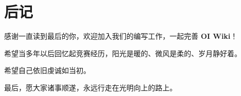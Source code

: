 \thispagestyle{empty}
\section*{\centering 后记}

\begin{center}
\par
感谢一直读到最后的你，欢迎加入我们的编写工作，一起完善 \textbf{OI Wiki}！

\vskip 0.4in
\par
希望当多年以后回忆起竞赛经历，阳光是暖的、微风是柔的、岁月静好着。

希望自己依旧虔诚如当初。
\vskip 0.2in

\vskip 0.2in
\par
最后，愿大家诸事顺遂，永远行走在光明向上的路上。
\end{center}
